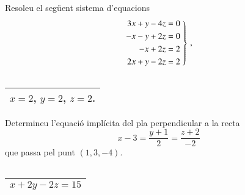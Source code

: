 \documentclass[11pt,catalan]{article}
\begin{document}
\begin{enunciat}
Resoleu el següent sistema d'equacions
\[
  \left.\aligned 3 x + y - 4 z &= 0 \\ - x - y + 2 z &= 0 \\ - x + 2 z &= 2 \\ 2 x + y - 2 z &= 2 \endaligned\;\right\}\,,
\]
\end{enunciat}

\begin{quadricula}
\begin{tabular}{|C{5cm}{0.5cm}|}
\hline
  \\
\hline
\end{tabular}
\end{quadricula}

\begin{solucio}
\begin{center}
\begin{tabular}{|C{5cm}{0.5cm}|}
\hline
$x=2$, $y=2$, $z=2$. \\
\hline
\end{tabular}
\end{center}
\end{solucio}


\begin{enunciat}
Determineu l'equació implícita del pla perpendicular a la recta 
\[
  x - 3 = \frac{y + 1}{2} = \frac{z + 2}{-2}
\]
que passa pel punt $(1,3,-4)$.
\end{enunciat}

\begin{quadricula}
\begin{tabular}{|C{5cm}{0.5cm}|}
\hline
  \\
\hline
\end{tabular}
\end{quadricula}

\begin{solucio}
\begin{center}
\begin{tabular}{|C{5cm}{0.5cm}|}
\hline
$x + 2 y - 2 z = 15$ \\
\hline
\end{tabular}
\end{center}
\end{solucio}
\end{document}
